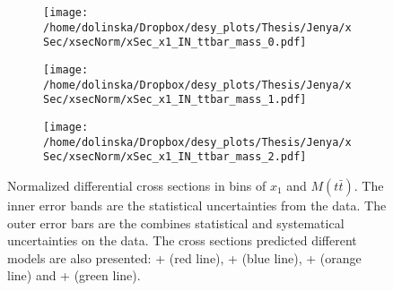 \begin{figure}[p]
\centering
\begin{subfigure}
  \centering
  \texttt{[image: /home/dolinska/Dropbox/desy\_plots/Thesis/Jenya/xSec/xsecNorm/xSec\_x1\_IN\_ttbar\_mass\_0.pdf]}
\end{subfigure}
\begin{subfigure}
  \centering
  \texttt{[image: /home/dolinska/Dropbox/desy\_plots/Thesis/Jenya/xSec/xsecNorm/xSec\_x1\_IN\_ttbar\_mass\_1.pdf]}
\end{subfigure}
\begin{subfigure}
  \centering
  \texttt{[image: /home/dolinska/Dropbox/desy\_plots/Thesis/Jenya/xSec/xsecNorm/xSec\_x1\_IN\_ttbar\_mass\_2.pdf]}
\end{subfigure}
\caption{Normalized differential cross sections in bins of  $x_{1}$ and $M(t\bar{t})$. The inner error bands are the statistical uncertainties from the data.
         The outer error bars are the combines statistical and systematical uncertainties on the data. The cross sections predicted different models are also presented:
         \MG + \PYTHIA (red line), \Powheg + \PYTHIA (blue line), \Powheg + \HERWIG (orange line) and \MCNLO + \HERWIG (green line).}
\label{fig:XS_2D_x1_Mtt}
\end{figure}

